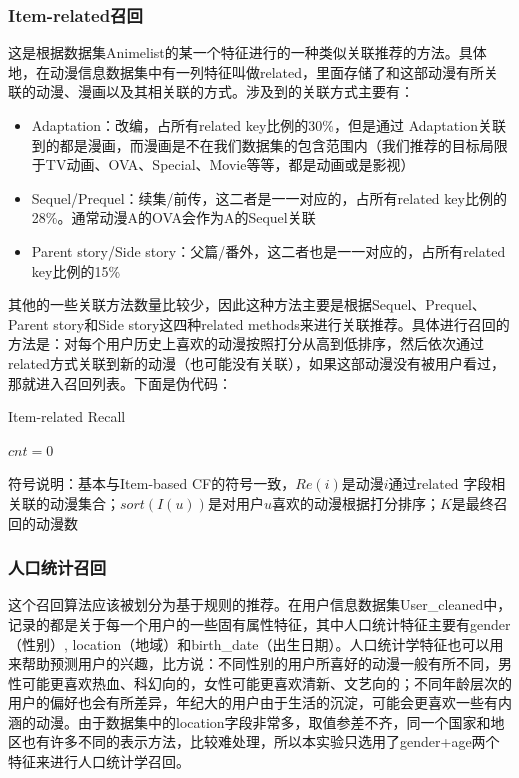 \subsubsection{Item-related召回}
这是根据数据集Animelist的某一个特征进行的一种类似关联推荐的方法。具体地，在动漫信息数据集中有一列特征叫做related，里面存储了和这部动漫有所关联的动漫、漫画以及其相关联的方式。涉及到的关联方式主要有：
\begin{itemize}
	\item Adaptation：改编，占所有related key比例的30\%，但是通过
	Adaptation关联到的都是漫画，而漫画是不在我们数据集的包含范围内（我们推荐的目标局限于TV动画、OVA、Special、Movie等等，都是动画或是影视）
	\item Sequel/Prequel：续集/前传，这二者是一一对应的，占所有related key比例的28\%。通常动漫A的OVA会作为A的Sequel关联
	\item Parent story/Side story：父篇/番外，这二者也是一一对应的，占所有related key比例的15\%
\end{itemize}
其他的一些关联方法数量比较少，因此这种方法主要是根据Sequel、Prequel、Parent story和Side story这四种related methods来进行关联推荐。具体进行召回的方法是：对每个用户历史上喜欢的动漫按照打分从高到低排序，然后依次通过related方式关联到新的动漫（也可能没有关联），如果这部动漫没有被用户看过，那就进入召回列表。下面是伪代码：
\begin{algorithm}[htbp]
	\caption{Item-related Recall}
	$cnt=0$\;
\end{algorithm}

符号说明：基本与Item-based CF的符号一致，$Re(i)$是动漫$i$通过related
字段相关联的动漫集合；$sort(I(u))$是对用户$u$喜欢的动漫根据打分排序；$K$是最终召回的动漫数

\subsubsection{人口统计召回}
这个召回算法应该被划分为基于规则的推荐。在用户信息数据集User\_cleaned中，记录的都是关于每一个用户的一些固有属性特征，其中人口统计特征主要有gender（性别）, location（地域）和birth\_date（出生日期）。人口统计学特征也可以用来帮助预测用户的兴趣，比方说：不同性别的用户所喜好的动漫一般有所不同，男性可能更喜欢热血、科幻向的，女性可能更喜欢清新、文艺向的；不同年龄层次的用户的偏好也会有所差异，年纪大的用户由于生活的沉淀，可能会更喜欢一些有内涵的动漫。由于数据集中的location字段非常多，取值参差不齐，同一个国家和地区也有许多不同的表示方法，比较难处理，所以本实验只选用了gender+age两个特征来进行人口统计学召回。

